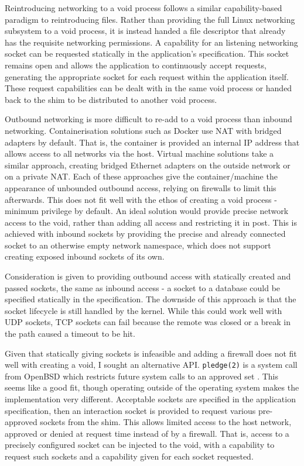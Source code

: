 \documentclass[12pt,a4paper,twoside]{report}
\begin{document}
Reintroducing networking to a void process follows a similar capability-based paradigm to reintroducing files. Rather than providing the full Linux networking subsystem to a void process, it is instead handed a file descriptor that already has the requisite networking permissions. A capability for an listening networking socket can be requested statically in the application's specification. This socket remains open and allows the application to continuously accept requests, generating the appropriate socket for each request within the application itself. These request capabilities can be dealt with in the same void process or handed back to the shim to be distributed to another void process.

Outbound networking is more difficult to re-add to a void process than inbound networking. Containerisation solutions such as Docker use NAT with bridged adapters by default. That is, the container is provided an internal IP address that allows access to all networks via the host. Virtual machine solutions take a similar approach, creating bridged Ethernet adapters on the outside network or on a private NAT. Each of these approaches give the container/machine the appearance of unbounded outbound access, relying on firewalls to limit this afterwards. This does not fit well with the ethos of creating a void process - minimum privilege by default. An ideal solution would provide precise network access to the void, rather than adding all access and restricting it in post. This is achieved with inbound sockets by providing the precise and already connected socket to an otherwise empty network namespace, which does not support creating exposed inbound sockets of its own.

Consideration is given to providing outbound access with statically created and passed sockets, the same as inbound access - a socket to a database could be specified statically in the specification. The downside of this approach is that the socket lifecycle is still handled by the kernel. While this could work well with UDP sockets, TCP sockets can fail because the remote was closed or a break in the path caused a timeout to be hit.

Given that statically giving sockets is infeasible and adding a firewall does not fit well with creating a void, I sought an alternative API. \texttt{pledge(2)} is a system call from OpenBSD which restricts future system calls to an approved set \citep{the_openbsd_foundation_pledge2_2022}. This seems like a good fit, though operating outside of the operating system makes the implementation very different. Acceptable sockets are specified in the application specification, then an interaction socket is provided to request various pre-approved sockets from the shim. This allows limited access to the host network, approved or denied at request time instead of by a firewall. That is, access to a precisely configured socket can be injected to the void, with a capability to request such sockets and a capability given for each socket requested.
\end{document}
